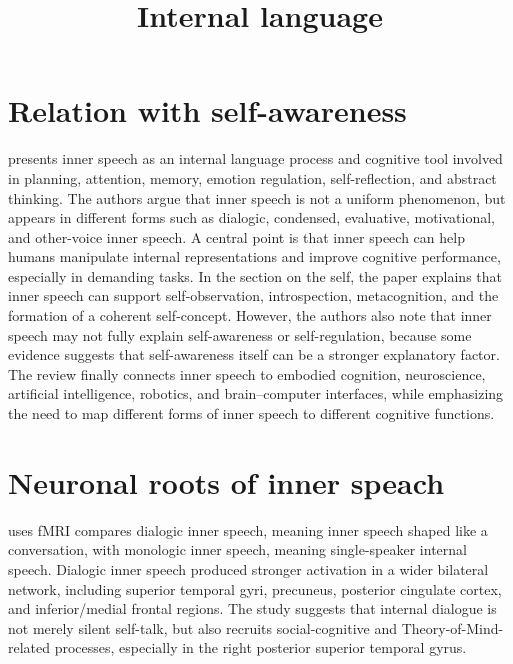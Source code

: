 \documentclass[a4paper]{article}
\title{Internal language}
\date{}
\begin{document}
    \maketitle
    
    
    \section{Relation with self-awareness}
        \cite{fernyhough-2023-inner-speech-as-language-process-and-cognitive-tool} presents inner speech as an internal language process and cognitive tool involved in planning, attention, memory, emotion regulation, self-reflection, and abstract thinking. The authors argue that inner speech is not a uniform phenomenon, but appears in different forms such as dialogic, condensed, evaluative, motivational, and other-voice inner speech. A central point is that inner speech can help humans manipulate internal representations and improve cognitive performance, especially in demanding tasks. In the section on the self, the paper explains that inner speech can support self-observation, introspection, metacognition, and the formation of a coherent self-concept. However, the authors also note that inner speech may not fully explain self-awareness or self-regulation, because some evidence suggests that self-awareness itself can be a stronger explanatory factor. The review finally connects inner speech to embodied cognition, neuroscience, artificial intelligence, robotics, and brain–computer interfaces, while emphasizing the need to map different forms of inner speech to different cognitive functions.
    
    
    \section{Neuronal roots of inner speach}
        \cite{alderson-day-2016-the-brains-conversation-with-itself-neural-substrates-of-dialogic-inner-speech} uses fMRI compares dialogic inner speech, meaning inner speech shaped like a conversation, with monologic inner speech, meaning single-speaker internal speech. Dialogic inner speech produced stronger activation in a wider bilateral network, including superior temporal gyri, precuneus, posterior cingulate cortex, and inferior/medial frontal regions. The study suggests that internal dialogue is not merely silent self-talk, but also recruits social-cognitive and Theory-of-Mind-related processes, especially in the right posterior superior temporal gyrus.
    
\end{document}
